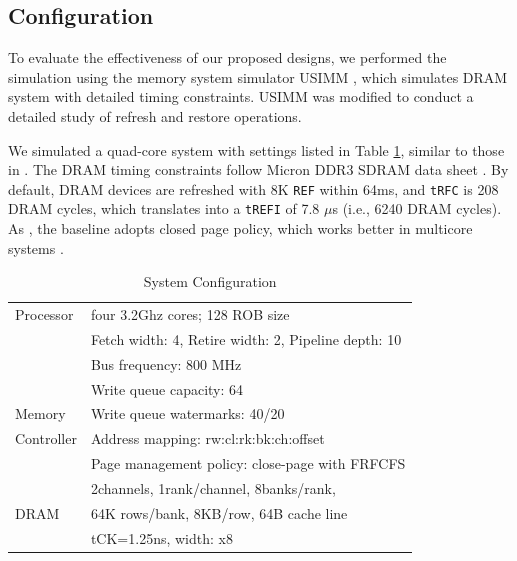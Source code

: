 \subsection{Configuration}\label{subsec:setting}
To evaluate the effectiveness of our proposed designs, we performed the simulation using the memory system simulator USIMM \cite{SIMU:usimm}, which simulates DRAM system with detailed timing constraints. 
USIMM was modified to conduct a detailed study of refresh and restore operations.

We simulated a quad-core system with settings listed in Table \ref{tab:configuration}, similar to those in \cite{HPCA13:refresh_pausing, HPCA14:nuat}. 
The DRAM timing constraints follow Micron DDR3 SDRAM data sheet \cite{SIMU:datasheet}. By default, DRAM devices are refreshed with 8K {\tt REF} within 64ms, and {\tt tRFC} is 208 DRAM cycles, which translates into a {\tt tREFI} of 7.8 $\mu$s (i.e., 6240 DRAM cycles). As  \cite{HPCA13:refresh_pausing}, the baseline adopts closed page policy, which works better in multicore systems \cite{PACT12:close_page}. 

\begin{table}[htbp]
\vspace{-0.2in}
\caption{System Configuration}
\vspace{-0.3in}
\begin{center}
\scalebox{0.8}
{
\begin{tabular}{l|l}
\hline\hline
Processor			&four 3.2Ghz cores; 128 ROB size\\
				&Fetch width: 4, Retire width: 2, Pipeline depth: 10\\
\hline
				&Bus frequency: 800 MHz\\
 				&Write queue capacity: 64\\
Memory			&Write queue watermarks: 40/20\\	
Controller			&Address mapping: rw:cl:rk:bk:ch:offset\\
				&Page management policy: close-page with FRFCFS\\

\hline
				&2channels, 1rank/channel, 8banks/rank, \\
DRAM			&64K rows/bank, 8KB/row, 64B cache line\\
				&tCK=1.25ns, width: x8\\
\hline\hline

\end{tabular}
}
\end{center}
\label{tab:configuration}
\vspace{-0.4in}
\end{table}

